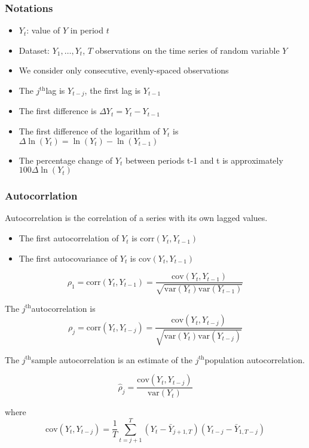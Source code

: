 \documentclass{article}
\newcommand{\sumlimitsjT}{\sum \limits _{t=j+1}^{T}}
\newcommand{\jth}{$j^{\text{th}}$}
\begin{document}
\subsubsection{Notations}

\begin{itemize}
	\item $Y_t$: value of $Y$ in period $t$
	\item Dataset: $Y_1, \ldots, Y_t$, $T$ observations on the time series of random variable $Y$
	\item We consider only consecutive, evenly-spaced observations
	\item The \jth lag is $Y_{t-j}$, the first lag is $Y_{t-1}$
	\item The first difference is $\Delta Y_t = Y_t - Y_{t-1}$
	\item The first difference of the logarithm of $Y_t$ is $\Delta \ln (Y_t) = \ln(Y_t) - \ln(Y_{t-1})$
	\item The percentage change of $Y_t$ between periods t-1 and t is approximately $100\Delta\ln(Y_t)$
\end{itemize}

\subsubsection{Autocorrlation}

Autocorrelation is the correlation of a series with its own lagged values.

\begin{itemize}
	\item The first autocorrelation of $Y_t$ is $\text{corr}(Y_t, Y_{t-1})$
	\item The first autocovariance of $Y_t$ is $\text{cov}(Y_t, Y_{t-1})$
\end{itemize}

\[
	\rho_1 = \text{corr}(Y_t, Y_{t-1}) = \dfrac{
		\text{cov}(Y_t, Y_{t-1})
	}{
		\sqrt{
			\text{var}(Y_t) \text{var}(Y_{t-1})
		}
	}
\]

The \jth autocorrelation is
\[
	\rho_j = \text{corr}(Y_t, Y_{t-j}) = \dfrac{
		\text{cov}(Y_t, Y_{t-j})
	}{
		\sqrt{
			\text{var}(Y_t) \text{var}(Y_{t-j})
		}
	}
\]

The \jth sample autocorrelation is an estimate of the \jth population autocorrelation.

\[
  \hat{\rho}_j = \dfrac{
		\text{cov}(Y_t, Y_{t-j})
	}{
		\text{var}(Y_t)
	}
\]

where
\[
	\text{cov}(Y_t,Y_{t-j}) = \dfrac{1}{T} \sumlimitsjT (Y_t - \bar{Y}_{j+1, T})(Y_{t-j} - \bar{Y}_{1, T-j})
\]
\end{document}
